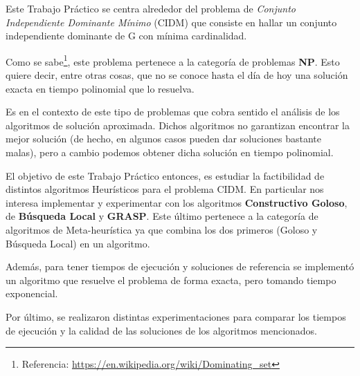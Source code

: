 Este Trabajo Práctico se centra alrededor del problema de \textit{Conjunto Independiente Dominante Mínimo} (CIDM) que consiste en hallar un conjunto
independiente dominante de G con mínima cardinalidad.

Como se sabe\footnote{Referencia: \url{https://en.wikipedia.org/wiki/Dominating_set}}, este problema pertenece a la categoría de problemas \textbf{NP}. Esto quiere decir, entre otras cosas, que no se conoce hasta el día de hoy una solución exacta en tiempo polinomial que lo resuelva.

Es en el contexto de este tipo de problemas que cobra sentido el análisis de los algoritmos de solución aproximada. Dichos algoritmos no garantizan encontrar la mejor solución (de hecho, en algunos casos pueden dar soluciones bastante malas), pero a cambio podemos obtener dicha solución en tiempo polinomial.

El objetivo de este Trabajo Práctico entonces, es estudiar la factibilidad de distintos algoritmos Heurísticos para el problema CIDM. En particular nos interesa implementar y experimentar con los algoritmos \textbf{Constructivo Goloso}, de \textbf{Búsqueda Local} y \textbf{GRASP}. Este último pertenece a la categoría de algoritmos de Meta-heurística ya que combina los dos primeros (Goloso y Búsqueda Local) en un algoritmo.

Además, para tener tiempos de ejecución y soluciones de referencia se implementó un algoritmo que resuelve el problema de forma exacta, pero tomando tiempo exponencial.

Por último, se realizaron distintas experimentaciones para comparar los tiempos de ejecución y la calidad de las soluciones de los algoritmos mencionados.
